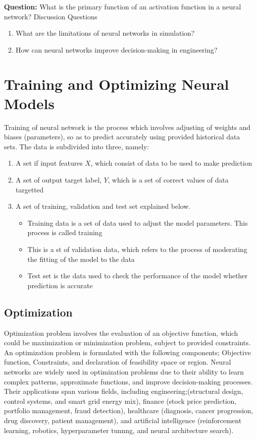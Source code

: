 \documentclass[12pt,a4paper]{article}
\begin{document}
\textbf{Question:} What is the primary function of an activation function in a neural network?
Discussion Questions
\begin{enumerate}
 \item What are the limitations of neural networks in simulation?
 \item How can neural networks improve decision-making in engineering?
\end{enumerate}

\section{Training and Optimizing Neural Models}
Training of neural network is the process which involves adjusting of weights and biases (parameters), so as to predict accurately using provided historical data sets. The data is subdivided into three, namely:
\begin{enumerate}
\item A set if input features $X$, which consist of data to be used to make prediction
\item A set of output target label, $Y$, which is a set of correct values of data targetted
\item A set of training, validation and test set explained below.
\begin{itemize}
\item Training data is a set of data used to adjust the model parameters. This process is called training
\item This is a st of validation data, which refers to the process of moderating the fitting of the model to the data
\item Test set is the data used to check the performance of the model whether prediction is accurate
\end{itemize}
\end{enumerate}
\subsection{Optimization}
Optimization problem involves the evaluation of an objective function, which could be maximization or minimization problem, subject to provided constraints. An optimization problem is formulated with the following components; Objective function, Constraints, and declaration of feasibility space or region. Neural networks are widely used in optimization problems due to their ability to learn complex patterns, approximate functions, and improve decision-making processes. Their applications span various fields, including engineering;(structural design, control systems, and smart grid energy mix), finance (stock price prediction, portfolio management, fraud detection), healthcare (diagnosis, cancer progression, drug discovery, patient management), and artificial intelligence (reinforcement learning, robotics, hyperparameter tunnng, and neural architecture search).
\end{document}
